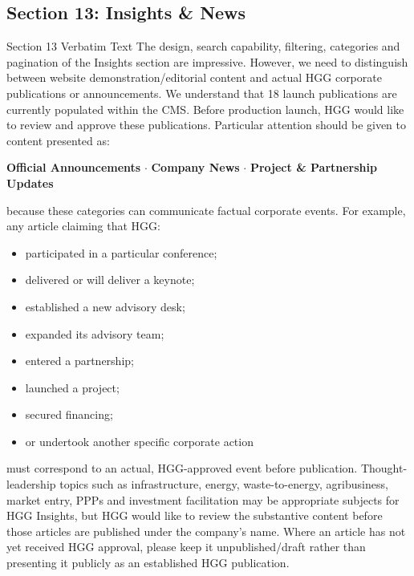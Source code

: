 \documentclass[11pt,a4paper]{article}
\begin{document}
\vspace{0.3cm}

\subsection{Section 13: Insights \& News}

\begin{VerbatimClientBox}{Section 13 Verbatim Text}
The design, search capability, filtering, categories and pagination of the Insights section are impressive.
However, we need to distinguish between website demonstration/editorial content and actual HGG corporate publications or announcements.
We understand that 18 launch publications are currently populated within the CMS.
Before production launch, HGG would like to review and approve these publications.
Particular attention should be given to content presented as:
\begin{center}
\textbf{Official Announcements} $\cdot$ \textbf{Company News} $\cdot$ \textbf{Project \& Partnership Updates}
\end{center}
because these categories can communicate factual corporate events.
For example, any article claiming that HGG:
\begin{itemize}[noitemsep]
    \item participated in a particular conference;
    \item delivered or will deliver a keynote;
    \item established a new advisory desk;
    \item expanded its advisory team;
    \item entered a partnership;
    \item launched a project;
    \item secured financing;
    \item or undertook another specific corporate action
\end{itemize}
must correspond to an actual, HGG-approved event before publication.
Thought-leadership topics such as infrastructure, energy, waste-to-energy, agribusiness, market entry, PPPs and investment facilitation may be appropriate subjects for HGG Insights, but HGG would like to review the substantive content before those articles are published under the company's name.
Where an article has not yet received HGG approval, please keep it unpublished/draft rather than presenting it publicly as an established HGG publication.
\end{VerbatimClientBox}
\end{document}
